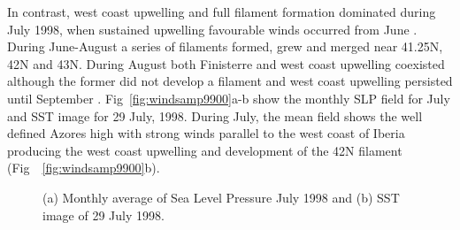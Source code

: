 In contrast, west coast upwelling and full filament formation
dominated during July 1998, when sustained upwelling favourable
winds occurred from June \citep{Smyth01}.  During June-August a
series of filaments formed, grew and merged near 41.25\deg N,
42\deg N and 43\deg N. During August both Finisterre and west
coast upwelling coexisted although the former did not develop a
filament and west coast upwelling persisted until September
\citep{Barton01}. {Fig~\ref{fig:windsamp9900}}a-b show the monthly
SLP field for July and SST image for 29 July, 1998. During July,
the mean field shows the well defined Azores high with strong
winds parallel to the west coast of Iberia producing the west
coast upwelling and development of the 42\deg N filament
(Fig~~\ref{fig:windsamp9900}b).
\begin{figure}[t]
\centering {}
\caption{(a) Monthly average of Sea Level Pressure July 1998 and
(b) SST image of 29 July 1998.}\label{fig:windsslp98}
\end{figure}



